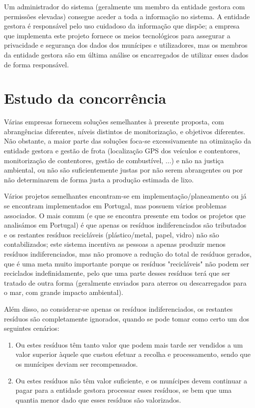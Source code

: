 \documentclass[11pt, a4paper, oneside]{book}
\begin{document}
Um administrador do sistema (geralmente um membro da entidade gestora com permissões elevadas) consegue aceder a toda a informação no sistema. A entidade gestora é responsável pelo uso cuidadoso da informação que dispõe; a empresa que implementa este projeto fornece os meios tecnológicos para assegurar a privacidade e segurança dos dados dos munícipes e utilizadores, mas os membros da entidade gestora são em última análise os encarregados de utilizar esses dados de forma responsável.

\section{Estudo da concorrência}

Várias empresas fornecem soluções semelhantes à presente proposta, com abrangências diferentes, níveis distintos de monitorização, e objetivos diferentes. Não obstante, a maior parte das soluções foca-se excessivamente na otimização da entidade gestora e gestão de frota (localização GPS dos veículos e contentores, monitorização de contentores, gestão de combustível, ...) e não na justiça ambiental, ou não são suficientemente justas por não serem abrangentes ou por não determinarem de forma justa a produção estimada de lixo.

Vários projetos semelhantes encontram-se em implementação/planeamento ou já se encontram implementados em Portugal, mas possuem vários problemas associados. O mais comum (e que se encontra presente em todos os projetos que analisámos em Portugal) é que apenas os resíduos indiferenciados são tributados e os restantes resíduos recicláveis (plástico/metal, papel, vidro) não são contabilizados; este sistema incentiva as pessoas a apenas produzir menos resíduos indiferenciados, mas não promove a redução do total de resíduos gerados, que é uma meta muito importante porque os resíduos "recicláveis" não podem ser reciclados indefinidamente, pelo que uma parte desses resíduos terá que ser tratado de outra forma (geralmente enviados para aterros ou descarregados para o mar, com grande impacto ambiental).

Além disso, ao considerar-se apenas os resíduos indiferenciados, os restantes resíduos são completamente ignorados, quando se pode tomar como certo um dos seguintes cenários:

\begin{enumerate}
    \itemsep0em
    \item Ou estes resíduos têm tanto valor que podem mais tarde ser vendidos a um valor superior àquele que custou efetuar a recolha e processamento, sendo que os munícipes deviam ser recompensados.
    \item Ou estes resíduos não têm valor suficiente, e os munícipes devem continuar a pagar para a entidade gestora processar esses resíduos, se bem que uma quantia menor dado que esses resíduos são valorizados.
\end{enumerate}
\end{document}
